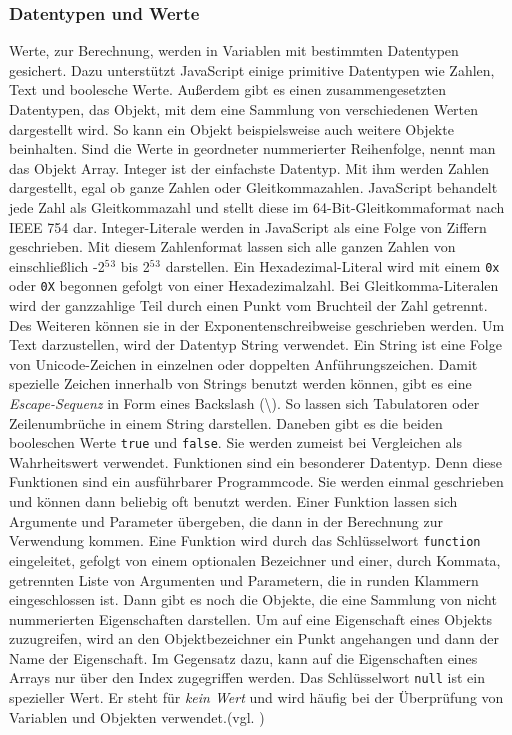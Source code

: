 \subsubsection{Datentypen und Werte} Werte, zur Berechnung, werden in Variablen mit bestimmten Datentypen gesichert. Dazu unterstützt JavaScript einige primitive Datentypen wie Zahlen, Text und boolesche Werte. Außerdem gibt es einen zusammengesetzten Datentypen, das Objekt, mit dem eine Sammlung von verschiedenen Werten dargestellt wird. So kann ein Objekt beispielsweise auch weitere Objekte beinhalten. Sind die Werte in geordneter nummerierter Reihenfolge, nennt man das Objekt Array. Integer ist der einfachste Datentyp. Mit ihm werden Zahlen dargestellt, egal ob ganze Zahlen oder Gleitkommazahlen. JavaScript behandelt jede Zahl als Gleitkommazahl und stellt diese im 64-Bit-Gleitkommaformat nach IEEE 754 dar. Integer-Literale werden in JavaScript als eine Folge von Ziffern geschrieben. Mit diesem Zahlenformat lassen sich alle ganzen Zahlen von einschließlich -2$^5$$^3$ bis 2$^5$$^3$ darstellen. Ein Hexadezimal-Literal wird mit einem \texttt{0x} oder \texttt{0X} begonnen gefolgt von einer Hexadezimalzahl. Bei Gleitkomma-Literalen wird der ganzzahlige Teil durch einen Punkt vom Bruchteil der Zahl getrennt. Des Weiteren können sie in der Exponentenschreibweise geschrieben werden. Um Text darzustellen, wird der Datentyp String verwendet. Ein String ist eine Folge von Unicode-Zeichen in einzelnen oder doppelten Anführungszeichen. Damit spezielle Zeichen innerhalb von Strings benutzt werden können, gibt es eine \textit{Escape-Sequenz} in Form eines Backslash (\textbackslash). So lassen sich Tabulatoren oder Zeilenumbrüche in einem String darstellen. Daneben gibt es die beiden booleschen Werte \texttt{true} und \texttt{false}. Sie werden zumeist bei Vergleichen als Wahrheitswert verwendet. Funktionen sind ein besonderer Datentyp. Denn diese Funktionen sind ein ausführbarer Programmcode. Sie werden einmal geschrieben und können dann beliebig oft benutzt werden. Einer Funktion lassen sich Argumente und Parameter übergeben, die dann in der Berechnung zur Verwendung kommen. Eine Funktion wird durch das Schlüsselwort \texttt{function} eingeleitet, gefolgt von einem optionalen Bezeichner und einer, durch Kommata, getrennten Liste von Argumenten und Parametern, die in runden Klammern eingeschlossen ist. Dann gibt es noch die Objekte, die eine Sammlung von nicht nummerierten Eigenschaften darstellen. Um auf eine Eigenschaft eines Objekts zuzugreifen, wird an den Objektbezeichner ein Punkt angehangen und dann der Name der Eigenschaft. Im Gegensatz dazu, kann auf die Eigenschaften eines Arrays nur über den Index zugegriffen werden. Das Schlüsselwort \texttt{null} ist ein spezieller Wert. Er steht für \textit{kein Wert} und wird häufig bei der Überprüfung von Variablen und Objekten verwendet.(vgl. \cite[S.22ff]{FlanJava2007})
	
